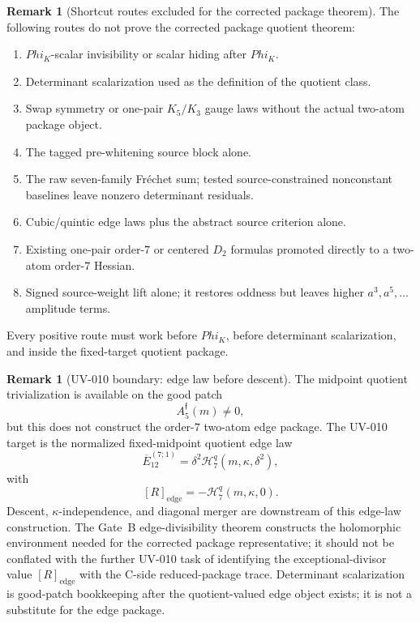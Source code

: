 \documentclass[11pt,a4paper]{amsart}
\def\Phi{Phi}%
\theoremstyle{plain}
\theoremstyle{definition}
\newtheorem{remark}[theorem]{Remark}
\begin{document}
\begin{remark}[Shortcut routes excluded for the corrected package theorem]
\label{rem:shortcut-routes-excluded-current-package-theorem}
The following routes do not prove the corrected package quotient theorem:
\begin{enumerate}
\item \(\Phi_K\)-scalar invisibility or scalar hiding after \(\Phi_K\).
\item Determinant scalarization used as the definition of the quotient
class.
\item Swap symmetry or one-pair \(K_5/K_3\) gauge laws without the actual
two-atom package object.
\item The tagged pre-whitening source block alone.
\item The raw seven-family Fr\'echet sum; tested source-constrained
nonconstant baselines leave nonzero determinant residuals.
\item Cubic/quintic edge laws plus the abstract source criterion alone.
\item Existing one-pair order-\(7\) or centered \(D_2\) formulas promoted
directly to a two-atom order-\(7\) Hessian.
\item Signed source-weight lift alone; it restores oddness but leaves
higher \(a^3,a^5,\ldots\) amplitude terms.
\end{enumerate}
Every positive route must work before \(\Phi_K\), before determinant
scalarization, and inside the fixed-target quotient package.
\end{remark}

\begin{remark}[UV-010 boundary: edge law before descent]
\label{rem:uv010-boundary-edge-law-before-descent}
The midpoint quotient trivialization is available on the good patch
\[
A_5^{\mathfrak f}(m)\ne0,
\]
but this does not construct the order-\(7\) two-atom edge package.  The
UV-010 target is the normalized fixed-midpoint quotient edge law
\[
\overline E_{12}^{(7;1)}
=
\delta^2\mathcal H_7^q(m,\kappa,\delta^2),
\]
with
\[
[R]_{\mathrm{edge}}=-\mathcal H_7^q(m,\kappa,0).
\]
Descent, \(\kappa\)-independence, and diagonal merger are downstream of
this edge-law construction.  The Gate~B edge-divisibility theorem
constructs the holomorphic environment needed for the corrected package
representative; it should not be conflated with the further UV-010 task of
identifying the exceptional-divisor value \([R]_{\mathrm{edge}}\) with the
C-side reduced-package trace.  Determinant scalarization is good-patch
bookkeeping after the quotient-valued edge object exists; it is not a
substitute for the edge package.
\end{remark}
\end{document}
